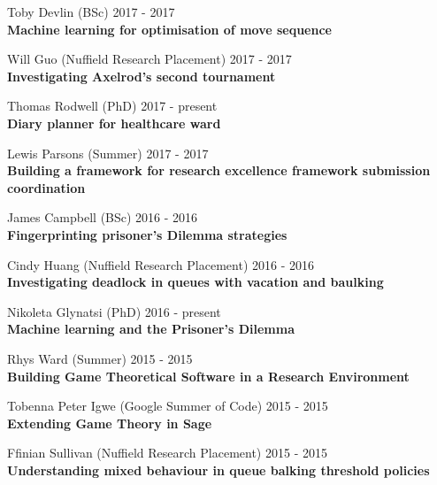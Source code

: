 \documentclass[10pt]{res} %
\begin{document}
\begin{resume}
\begin{etaremune}
\item
    Toby Devlin (BSc) \hfill 2017 -
    2017\\
\textbf{Machine learning for optimisation of move sequence}\\

\item
    Will Guo (Nuffield Research Placement) \hfill 2017 -
    2017\\
\textbf{Investigating Axelrod's second tournament}\\

\item
    Thomas Rodwell (PhD) \hfill 2017 -
    present\\
\textbf{Diary planner for healthcare ward}\\

\item
    Lewis Parsons (Summer) \hfill 2017 -
    2017\\
\textbf{Building a framework for research excellence framework submission coordination}\\

\item
    James Campbell (BSc) \hfill 2016 -
    2016\\
\textbf{Fingerprinting prisoner's Dilemma strategies}\\

\item
    Cindy Huang (Nuffield Research Placement) \hfill 2016 -
    2016\\
\textbf{Investigating deadlock in queues with vacation and baulking}\\

\item
    Nikoleta Glynatsi (PhD) \hfill 2016 -
    present\\
\textbf{Machine learning and the Prisoner's Dilemma}\\

\item
    Rhys Ward (Summer) \hfill 2015 -
    2015\\
\textbf{Building Game Theoretical Software in a Research Environment}\\

\item
    Tobenna Peter Igwe (Google Summer of Code) \hfill 2015 -
    2015\\
\textbf{Extending Game Theory in Sage}\\

\item
    Ffinian Sullivan (Nuffield Research Placement) \hfill 2015 -
    2015\\
\textbf{Understanding mixed behaviour in queue balking threshold policies}\\


\end{etaremune}
\end{resume}
\end{document}

